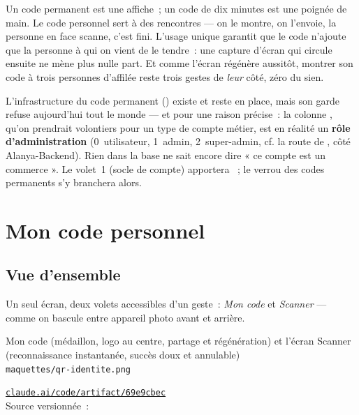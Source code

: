 \begin{note}
Un code permanent est une affiche~; un code de dix minutes est une poignée de main. Le
code personnel sert à des rencontres --- on le montre, on l'envoie, la personne en face
scanne, c'est fini. L'usage unique garantit que le code n'ajoute que la personne à qui on
vient de le tendre~: une capture d'écran qui circule ensuite ne mène plus nulle part. Et
comme l'écran régénère aussitôt, montrer son code à trois personnes d'affilée reste
trois gestes de \emph{leur} côté, zéro du sien.
\end{note}

\begin{constat}
L'infrastructure du code permanent () existe et reste en
place, mais son garde refuse aujourd'hui tout le monde --- et pour une raison précise~:
la colonne , qu'on prendrait volontiers pour un type de compte
métier, est en réalité un \textbf{rôle d'administration} (0~utilisateur, 1~admin,
2~super-admin, cf. la route  de ,
côté Alanya-Backend). Rien dans la base ne sait encore dire « ce compte est un
commerce ». Le volet~1 (socle de compte) apportera ~; le verrou des
codes permanents s'y branchera alors.
\end{constat}

\chapter{Mon code personnel}

\section{Vue d'ensemble}

Un seul écran, deux volets accessibles d'un geste~: \emph{Mon code} et \emph{Scanner} ---
comme on bascule entre appareil photo avant et arrière.

\begin{center}
    {Mon code (médaillon, logo au centre, partage et régénération) et l'écran Scanner
     (reconnaissance instantanée, succès doux et annulable)\\
     \texttt{maquettes/qr-identite.png}}
\end{center}

\begin{note}
\href{https://claude.ai/code/artifact/69e9cbec-ff13-48fc-903f-673648874b2a}%
{\texttt{claude.ai/code/artifact/69e9cbec}}\\
Source versionnée~: 
\end{note}

